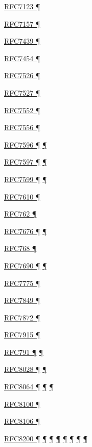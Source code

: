\documentclass[
]{article}
\begin{document}
\hyperref[filtering]{RFC7123 ¶}

\hyperref[multihoming]{RFC7157 ¶}

\hyperref[tunnels]{RFC7439 ¶}

\hyperref[filtering]{RFC7454 ¶}

\hyperref[obsolete-techniques]{RFC7526 ¶}

\hyperref[auto-configuration]{RFC7527 ¶}

\hyperref[tunnels]{RFC7552 ¶}

\hyperref[multihoming]{RFC7556 ¶}

\hyperref[dual-stack-scenarios]{RFC7596 ¶}
\hyperref[translation-and-ipv4-as-a-service]{¶}

\hyperref[dual-stack-scenarios]{RFC7597 ¶}
\hyperref[translation-and-ipv4-as-a-service]{¶}

\hyperref[dual-stack-scenarios]{RFC7599 ¶}
\hyperref[translation-and-ipv4-as-a-service]{¶}

\hyperref[layer-2-considerations]{RFC7610 ¶}

\hyperref[why-version-6]{RFC762 ¶}

\hyperref[layer-2-functions]{RFC7676 ¶} \hyperref[tunnels]{¶}

\hyperref[transport-protocols]{RFC768 ¶}

\hyperref[extension-headers-and-options]{RFC7690 ¶}
\hyperref[packet-size-and-jumbo-frames]{¶}

\hyperref[routing]{RFC7775 ¶}

\hyperref[layer-2-considerations]{RFC7849 ¶}

\hyperref[extension-headers-and-options]{RFC7872 ¶}

\hyperref[translation-and-ipv4-as-a-service]{RFC7915 ¶}

\hyperref[why-version-6]{RFC791 ¶}
\hyperref[traffic-class-and-flow-label]{¶}

\hyperref[auto-configuration]{RFC8028 ¶}
\hyperref[multi-prefix-operation]{¶}

\hyperref[addresses]{RFC8064 ¶} \hyperref[auto-configuration]{¶}
\hyperref[layer-2-functions]{¶}

\hyperref[traffic-class-and-flow-label]{RFC8100 ¶}

\hyperref[auto-configuration]{RFC8106 ¶}

\hyperref[how-to-keep-up-to-date]{RFC8200 ¶}
\hyperref[ipv6-basic-technology]{¶} \hyperref[address-resolution]{¶}
\hyperref[extension-headers-and-options]{¶} \hyperref[packet-format]{¶}
\hyperref[further-reading]{¶} \hyperref[filtering]{¶}
\hyperref[markdown-usage]{¶}
\end{document}
